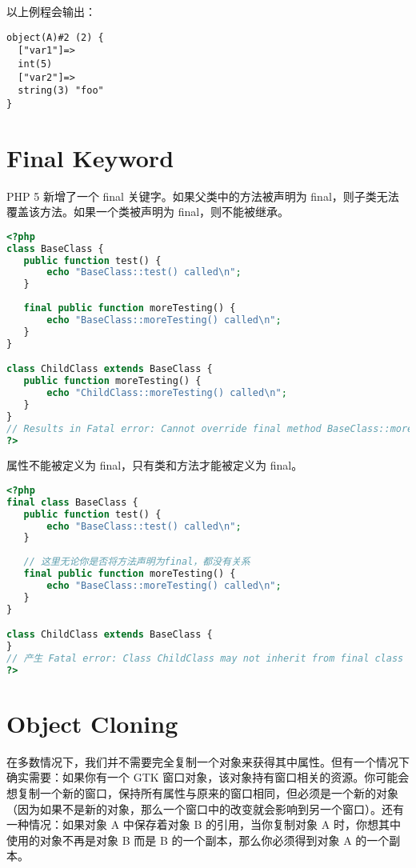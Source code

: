 以上例程会输出：

\begin{verbatim}
object(A)#2 (2) {
  ["var1"]=>
  int(5)
  ["var2"]=>
  string(3) "foo"
}
\end{verbatim}


\chapter{Final Keyword}

PHP 5 新增了一个 final 关键字。如果父类中的方法被声明为 final，则子类无法覆盖该方法。如果一个类被声明为 final，则不能被继承。

\begin{lstlisting}[language=PHP]
<?php
class BaseClass {
   public function test() {
       echo "BaseClass::test() called\n";
   }
   
   final public function moreTesting() {
       echo "BaseClass::moreTesting() called\n";
   }
}

class ChildClass extends BaseClass {
   public function moreTesting() {
       echo "ChildClass::moreTesting() called\n";
   }
}
// Results in Fatal error: Cannot override final method BaseClass::moreTesting()
?>
\end{lstlisting}


属性不能被定义为 final，只有类和方法才能被定义为 final。



\begin{lstlisting}[language=PHP]
<?php
final class BaseClass {
   public function test() {
       echo "BaseClass::test() called\n";
   }
   
   // 这里无论你是否将方法声明为final，都没有关系
   final public function moreTesting() {
       echo "BaseClass::moreTesting() called\n";
   }
}

class ChildClass extends BaseClass {
}
// 产生 Fatal error: Class ChildClass may not inherit from final class (BaseClass)
?>
\end{lstlisting}

\chapter{Object Cloning}

在多数情况下，我们并不需要完全复制一个对象来获得其中属性。但有一个情况下确实需要：如果你有一个 GTK 窗口对象，该对象持有窗口相关的资源。你可能会想复制一个新的窗口，保持所有属性与原来的窗口相同，但必须是一个新的对象（因为如果不是新的对象，那么一个窗口中的改变就会影响到另一个窗口）。还有一种情况：如果对象 A 中保存着对象 B 的引用，当你复制对象 A 时，你想其中使用的对象不再是对象 B 而是 B 的一个副本，那么你必须得到对象 A 的一个副本。

